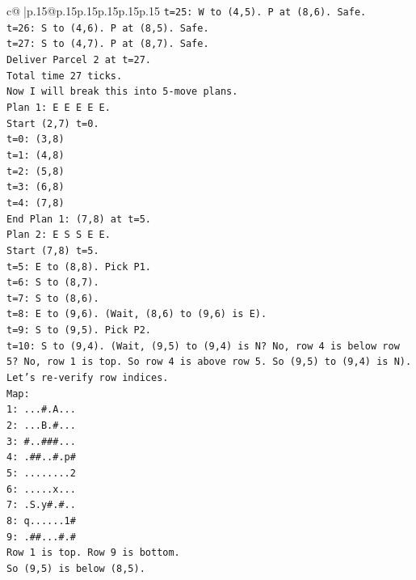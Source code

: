 \documentclass{article}
\begin{document}
{\begin{supertabular}{c@{$\;$}|p{.15\linewidth}@{}p{.15\linewidth}p{.15\linewidth}p{.15\linewidth}p{.15\linewidth}p{.15\linewidth}}
{{{\texttt{t=25: W to (4,5). P at (8,6). Safe.} \\
\texttt{t=26: S to (4,6). P at (8,5). Safe.} \\
\texttt{t=27: S to (4,7). P at (8,7). Safe.} \\
\texttt{Deliver Parcel 2 at t=27.} \\
\texttt{Total time 27 ticks.} \\
\texttt{Now I will break this into 5{-}move plans.} \\
\texttt{Plan 1: E E E E E.} \\
\texttt{Start (2,7) t=0.} \\
\texttt{t=0: (3,8)} \\
\texttt{t=1: (4,8)} \\
\texttt{t=2: (5,8)} \\
\texttt{t=3: (6,8)} \\
\texttt{t=4: (7,8)} \\
\texttt{End Plan 1: (7,8) at t=5.} \\
\texttt{Plan 2: E S S E E.} \\
\texttt{Start (7,8) t=5.} \\
\texttt{t=5: E to (8,8). Pick P1.} \\
\texttt{t=6: S to (8,7).} \\
\texttt{t=7: S to (8,6).} \\
\texttt{t=8: E to (9,6). (Wait, (8,6) to (9,6) is E).} \\
\texttt{t=9: S to (9,5). Pick P2.} \\
\texttt{t=10: S to (9,4). (Wait, (9,5) to (9,4) is N? No, row 4 is below row 5? No, row 1 is top. So row 4 is above row 5. So (9,5) to (9,4) is N).} \\
\texttt{Let's re{-}verify row indices.} \\
\texttt{Map:} \\
\texttt{1: ...\#.A...} \\
\texttt{2: ...B.\#...} \\
\texttt{3: \#..\#\#\#...} \\
\texttt{4: .\#\#..\#.p\#} \\
\texttt{5: ........2} \\
\texttt{6: .....x...} \\
\texttt{7: .S.y\#.\#..} \\
\texttt{8: q......1\#} \\
\texttt{9: .\#\#...\#.\#} \\
\texttt{Row 1 is top. Row 9 is bottom.} \\
\texttt{So (9,5) is below (8,5).} \\
}}}
\end{supertabular}}
\end{document}
